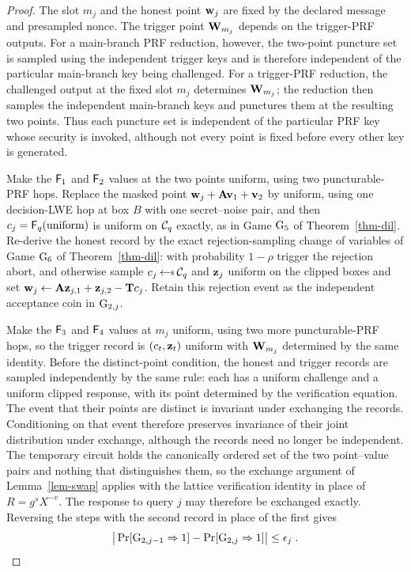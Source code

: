 \begin{proof}
The slot $m_j$ and the honest point $\mathbf{w}_j$ are fixed by the declared message and presampled nonce. The trigger point $\mathbf{W}_{m_j}$ depends on the trigger-PRF outputs. For a main-branch PRF reduction, however, the two-point puncture set is sampled using the independent trigger keys and is therefore independent of the particular main-branch key being challenged. For a trigger-PRF reduction, the challenged output at the fixed slot $m_j$ determines $\mathbf{W}_{m_j}$; the reduction then samples the independent main-branch keys and punctures them at the resulting two points. Thus each puncture set is independent of the particular PRF key whose security is invoked, although not every point is fixed before every other key is generated.

Make the $\mathsf{F}_1$ and $\mathsf{F}_2$ values at the two points uniform, using two puncturable-PRF hops. Replace the masked point $\mathbf{w}_j + \mathbf{A}\mathbf{v}_1 + \mathbf{v}_2$ by uniform, using one decision-LWE hop at box $B$ with one secret--noise pair, and then $c_j = \mathsf{F}_q(\text{uniform})$ is uniform on $\mathcal{C}_q$ exactly, as in Game $\textnormal{G}_5$ of Theorem~\ref{thm-dil}. Re-derive the honest record by the exact rejection-sampling change of variables of Game $\textnormal{G}_6$ of Theorem~\ref{thm-dil}: with probability $1-\rho$ trigger the rejection abort, and otherwise sample $c_j \getsr \chal_q$ and $\mathbf{z}_j$ uniform on the clipped boxes and set $\mathbf{w}_j \gets \mathbf{A}\mathbf{z}_{j,1} + \mathbf{z}_{j,2} - \mathbf{T}c_j$. Retain this rejection event as the independent acceptance coin in $\textnormal{G}_{2,j}$.

Make the $\mathsf{F}_3$ and $\mathsf{F}_4$ values at $m_j$ uniform, using two more puncturable-PRF hops, so the trigger record is $(c_t, \mathbf{z}_t)$ uniform with $\mathbf{W}_{m_j}$ determined by the same identity. Before the distinct-point condition, the honest and trigger records are sampled independently by the same rule: each has a uniform challenge and a uniform clipped response, with its point determined by the verification equation. The event that their points are distinct is invariant under exchanging the records. Conditioning on that event therefore preserves invariance of their joint distribution under exchange, although the records need no longer be independent. The temporary circuit holds the canonically ordered set of the two point--value pairs and nothing that distinguishes them, so the exchange argument of Lemma~\ref{lem-swap} applies with the lattice verification identity in place of $R = g^{s}X^{-v}$. The response to query $j$ may therefore be exchanged exactly. Reversing the steps with the second record in place of the first gives
$$
\big|\Pr[\textnormal{G}_{2,j-1} \Rightarrow 1] - \Pr[\textnormal{G}_{2,j} \Rightarrow 1]\big| \le \epsilon_j \;.
$$


\end{proof}

